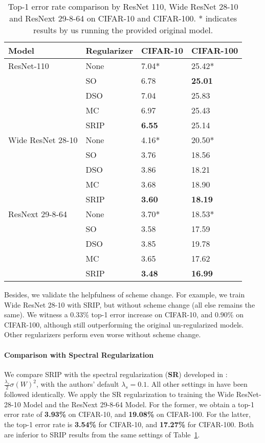 \documentclass{article}
\begin{document}
 \begin{table}
    \center
    \caption{Top-1 error rate comparison by ResNet 110, Wide ResNet 28-10 and ResNext 29-8-64 on CIFAR-10 and CIFAR-100. * indicates results by us running the provided original model.}
    \label{table:cifar_accuracy}
    \begin{tabular}{p{4cm} p{2.7cm} p{2.7cm}p{2.5cm}}
        \hline
        Model& Regularizer & CIFAR-10 & CIFAR-100 \\
        \hline
        ResNet-110 \cite{he2016deep}&None &7.04*&25.42*\\
        & SO    & 6.78 & \textbf{25.01}\\
        & DSO   & 7.04 & 25.83 \\
        & MC    & 6.97 & 25.43\\
        & SRIP   & \textbf{6.55}  & 25.14 \\
        \hline
        Wide ResNet 28-10 \cite{zagoruyko2016wide}&None&4.16*&20.50*\\
        & SO    & 3.76 & 18.56 \\
        & DSO   & 3.86 & 18.21 \\
        & MC    & 3.68 & 18.90 \\
        & SRIP  & \textbf{3.60} & \textbf{18.19} \\
        \hline
        ResNext 29-8-64 \cite{xie2017aggregated}&None&3.70*&18.53*\\
        &SO&3.58 &17.59\\
        &DSO&3.85&19.78\\
        &MC&3.65&17.62\\
        &SRIP&\textbf{3.48}&\textbf{16.99}\\
        \hline
    \end{tabular}
    \vspace{-1em}
\end{table}

Besides, we validate the helpfulness of scheme change. For example, we train Wide ResNet 28-10 with SRIP, but without scheme change (all else remains the same). We witness a $0.33\%$ top-1 error increase on CIFAR-10, and $0.90\%$ on CIFAR-100, although still outperforming the original un-regularized models. Other regularizers perform even worse without scheme change.

\vspace{-0.8em}
\paragraph{Comparison with Spectral Regularization}
We compare SRIP with the spectral regularization (\textbf{SR}) developed in \cite{yoshida2017spectral}: $\frac{\lambda_s}{2} \sigma(W)^2$, with the authors' default $\lambda_s = 0.1$. All other settings in \cite{yoshida2017spectral} have been followed identically. We apply the SR regularization to training the Wide ResNet-28-10 Model and the ResNext 29-8-64 Model. For the former, we obtain a top-1 error rate of \textbf{3.93\%} on CIFAR-10, and \textbf{19.08\%} on CIFAR-100. For the latter, the top-1 error rate is \textbf{3.54\%} for CIFAR-10, and \textbf{17.27\%} for CIFAR-100. Both are inferior to SRIP results from the same settings of Table~\ref{table:cifar_accuracy}.
\end{document}
